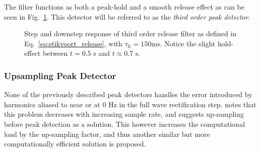 \documentclass[../main2.tex]{subfiles}
\providecommand{\rootdir}{..}
\begin{document}
The filter functions as both a peak-hold and a smooth release effect as can be seen in Fig.~\ref{fig:step_stikvoort_release}. This detector will be referred to as the \emph{third order peak detector}.
\begin{figure}
\centerline{}
\caption{Step and downstep response of third order release filter as defined in Eq.~\eqref{eq:stikvoort_release}, with $\tau_\text{lr} = 150 \text{ms}$. Notice the slight hold-effect between $t=0.5$ s and $t \approx 0.7$ s.}
\label{fig:step_stikvoort_release}
\end{figure}

\subsubsection{Upsampling Peak Detector}\label{theory_upsampling_peak_det}
None of the previously described peak detectors handles the error introduced by harmonics aliased to near or at 0 Hz in the full wave rectification step. \cite{frindle1996implementation} notes that this problem decreases with increasing sample rate, and suggests up-sampling before peak detection as a solution. This however increases the computational load by the up-sampling factor, and thus another similar but more computationally efficient solution is proposed.
\end{document}
